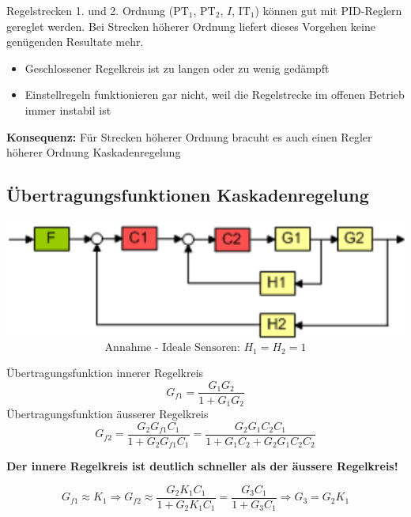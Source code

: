 Regelstrecken 1. und 2. Ordnung ($\text{PT}_1$, $\text{PT}_2$, $I$, $\text{IT}_1$) können gut mit PID-Reglern gereglet werden. 
Bei Strecken höherer Ordnung liefert dieses Vorgehen keine genügenden Resultate mehr.

\begin{itemize}
    \item Geschlossener Regelkreis ist zu langen oder zu wenig gedämpft
    \item Einstellregeln funktionieren gar nicht, weil die Regelstrecke im offenen Betrieb immer instabil ist
\end{itemize}

\textbf{Konsequenz:} Für Strecken höherer Ordnung bracuht es auch einen Regler höherer Ordnung \textrightarrow Kaskadenregelung


\subsection{Übertragungsfunktionen Kaskadenregelung}

\begin{minipage}[c]{0.48\columnwidth}
    \includegraphics[width=\columnwidth]{images/kaskadenregelung_struktur.png}
    $$ \text{Annahme - Ideale Sensoren: } H_1 = H_2 = 1$$
\end{minipage}
\hfill
\begin{minipage}[c]{0.48\columnwidth}
    Übertragungsfunktion innerer Regelkreis
    $$ G_{f1} = \frac{G_1 G_2}{1 + G_1 G_2} $$
    Übertragungsfunktion äusserer Regelkreis
    $$ \textstyle{ G_{f2} = \frac{G_2 G_{f1} C_1}{1 + G_2 G_{f1} C_1} = \frac{G_2 G_1 C_2 C_1}{1 + G_1 C_2 + G_2 G_1 C_2 C_2}} $$
\end{minipage}

\vspace{0.2cm}
\textbf{Der innere Regelkreis ist deutlich schneller als der äussere Regelkreis!}

$$ G_{f1} \approx K_1 \Rightarrow G_{f2} \approx \frac{G_2 K_1 C_1}{1 + G_2 K_1 C_1} = \frac{G_3 C_1}{1 + G_3 C_1} \Rightarrow G_3 = G_2 K_1 $$

